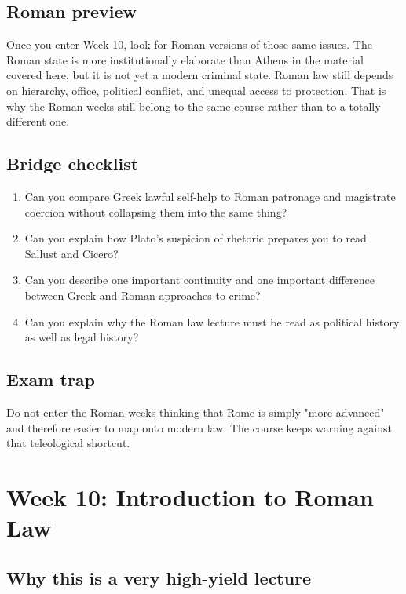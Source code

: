 \documentclass[11pt]{article}
\begin{document}
\subsection{Roman preview}

Once you enter Week 10, look for Roman versions of those same issues. The Roman state is more institutionally elaborate than Athens in the material covered here, but it is not yet a modern criminal state. Roman law still depends on hierarchy, office, political conflict, and unequal access to protection. That is why the Roman weeks still belong to the same course rather than to a totally different one.

\subsection{Bridge checklist}

\begin{enumerate}
\item Can you compare Greek lawful self-help to Roman patronage and magistrate coercion without collapsing them into the same thing?
\item Can you explain how Plato's suspicion of rhetoric prepares you to read Sallust and Cicero?
\item Can you describe one important continuity and one important difference between Greek and Roman approaches to crime?
\item Can you explain why the Roman law lecture must be read as political history as well as legal history?
\end{enumerate}

\subsection{Exam trap}

Do not enter the Roman weeks thinking that Rome is simply "more advanced" and therefore easier to map onto modern law. The course keeps warning against that teleological shortcut.

\section{Week 10: Introduction to Roman Law}

\subsection{Why this is a very high-yield lecture}
\end{document}
